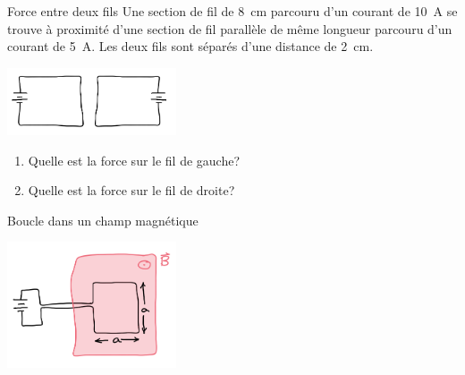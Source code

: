 \documentclass{beamer}
\begin{document}
\begin{frame}{Force entre deux fils}
  Une section de fil de \SI{8}{\centi\meter} parcouru d'un courant de
  \SI{10}{\ampere} se trouve à proximité d'une section de fil parallèle de même
  longueur parcouru d'un courant de \SI{5}{\ampere}. Les deux fils sont séparés
  d'une distance de \SI{2}{\centi\meter}.
  \begin{center}
    \includegraphics[width=5cm]{figures/deux_fils.png}
  \end{center}
  \begin{enumerate}
    \item Quelle est la force sur le fil de gauche?
    \item Quelle est la force sur le fil de droite?
  \end{enumerate}
\end{frame}


\begin{frame}{Boucle dans un champ magnétique}
  \begin{center}
    \includegraphics[width=5cm]{figures/boucle_dans_mag.png}
  \end{center}


\end{frame}
\end{document}
